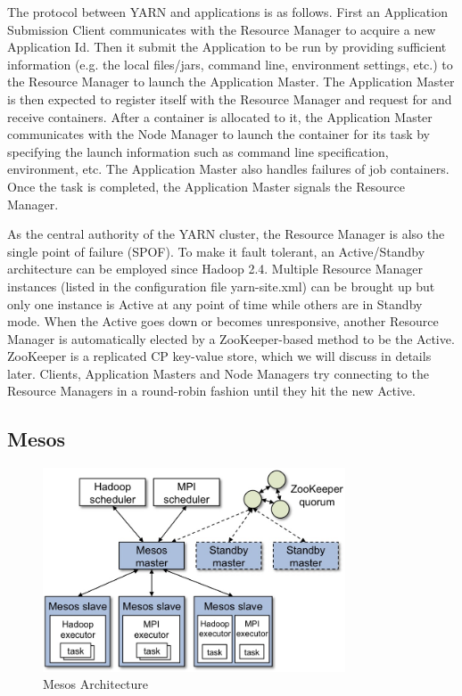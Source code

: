 \documentclass[11pt]{book}
\begin{document}
The protocol between YARN and applications is as follows. First an Application Submission Client communicates with the Resource Manager to acquire a new Application Id. Then it submit the Application to be run by providing sufficient information (e.g. the local files/jars, command line, environment settings, etc.) to the Resource Manager to launch the Application Master. 
The Application Master is then expected to register itself with the Resource Manager and request for and receive containers. After a container is allocated to it, the Application Master communicates with the Node Manager to launch the container for its task by specifying the launch information such as command line specification, environment, etc. The Application Master also handles failures of job containers. Once the task is completed, the Application Master signals the Resource Manager.

As the central authority of the YARN cluster, the Resource Manager is also the single point of failure (SPOF). To make it fault tolerant, an Active/Standby architecture can be employed since Hadoop 2.4. Multiple Resource Manager instances (listed in the configuration file yarn-site.xml) can be brought up but only one instance is Active at any point of time while others are in Standby mode. 
When the Active goes down or becomes unresponsive, another Resource Manager is automatically elected by a ZooKeeper-based method to be the Active. ZooKeeper is a replicated CP key-value store, which we will discuss in details later. Clients, Application Masters and Node Managers try connecting to the Resource Managers in a round-robin fashion until they hit the new Active. 

\subsection[Mesos]
{Mesos}
\begin{figure}[t]
\includegraphics[width=0.8\textwidth]{images/mesos-architecture.jpg}
\centering
\caption{Mesos Architecture}
\end{figure}
\end{document}
